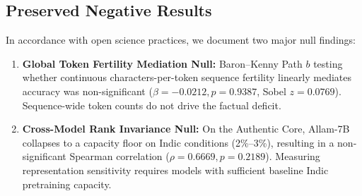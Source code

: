 \subsection{Preserved Negative Results}
In accordance with open science practices, we document two major null findings:
\begin{enumerate}
    \item \textbf{Global Token Fertility Mediation Null:} Baron--Kenny Path $b$ testing whether continuous characters-per-token sequence fertility linearly mediates accuracy was non-significant ($\beta = -0.0212, p = 0.9387$, Sobel $z = 0.0769$). Sequence-wide token counts do not drive the factual deficit.
    \item \textbf{Cross-Model Rank Invariance Null:} On the Authentic Core, Allam-7B collapses to a capacity floor on Indic conditions (2\%--3\%), resulting in a non-significant Spearman correlation ($\rho = 0.6669, p = 0.2189$). Measuring representation sensitivity requires models with sufficient baseline Indic pretraining capacity.
\end{enumerate}
